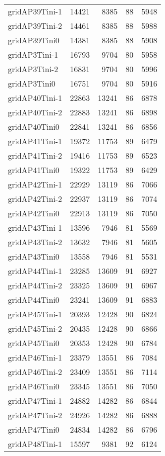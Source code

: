 \documentclass[../../../thesis.tex]{subfiles}
\begin{document}
\begin{longtable}{lrrrr}
gridAP39Tini-1 & 14421 & 8385 & 88 & 5948 \\
gridAP39Tini-2 & 14461 & 8385 & 88 & 5988 \\
gridAP39Tini0 & 14381 & 8385 & 88 & 5908 \\
gridAP3Tini-1 & 16793 & 9704 & 80 & 5958 \\
gridAP3Tini-2 & 16831 & 9704 & 80 & 5996 \\
gridAP3Tini0 & 16751 & 9704 & 80 & 5916 \\
gridAP40Tini-1 & 22863 & 13241 & 86 & 6878 \\
gridAP40Tini-2 & 22883 & 13241 & 86 & 6898 \\
gridAP40Tini0 & 22841 & 13241 & 86 & 6856 \\
gridAP41Tini-1 & 19372 & 11753 & 89 & 6479 \\
gridAP41Tini-2 & 19416 & 11753 & 89 & 6523 \\
gridAP41Tini0 & 19322 & 11753 & 89 & 6429 \\
gridAP42Tini-1 & 22929 & 13119 & 86 & 7066 \\
gridAP42Tini-2 & 22937 & 13119 & 86 & 7074 \\
gridAP42Tini0 & 22913 & 13119 & 86 & 7050 \\
gridAP43Tini-1 & 13596 & 7946 & 81 & 5569 \\
gridAP43Tini-2 & 13632 & 7946 & 81 & 5605 \\
gridAP43Tini0 & 13558 & 7946 & 81 & 5531 \\
gridAP44Tini-1 & 23285 & 13609 & 91 & 6927 \\
gridAP44Tini-2 & 23325 & 13609 & 91 & 6967 \\
gridAP44Tini0 & 23241 & 13609 & 91 & 6883 \\
gridAP45Tini-1 & 20393 & 12428 & 90 & 6824 \\
gridAP45Tini-2 & 20435 & 12428 & 90 & 6866 \\
gridAP45Tini0 & 20353 & 12428 & 90 & 6784 \\
gridAP46Tini-1 & 23379 & 13551 & 86 & 7084 \\
gridAP46Tini-2 & 23409 & 13551 & 86 & 7114 \\
gridAP46Tini0 & 23345 & 13551 & 86 & 7050 \\
gridAP47Tini-1 & 24882 & 14282 & 86 & 6844 \\
gridAP47Tini-2 & 24926 & 14282 & 86 & 6888 \\
gridAP47Tini0 & 24834 & 14282 & 86 & 6796 \\
gridAP48Tini-1 & 15597 & 9381 & 92 & 6124 \\

\end{longtable}
\end{document}

